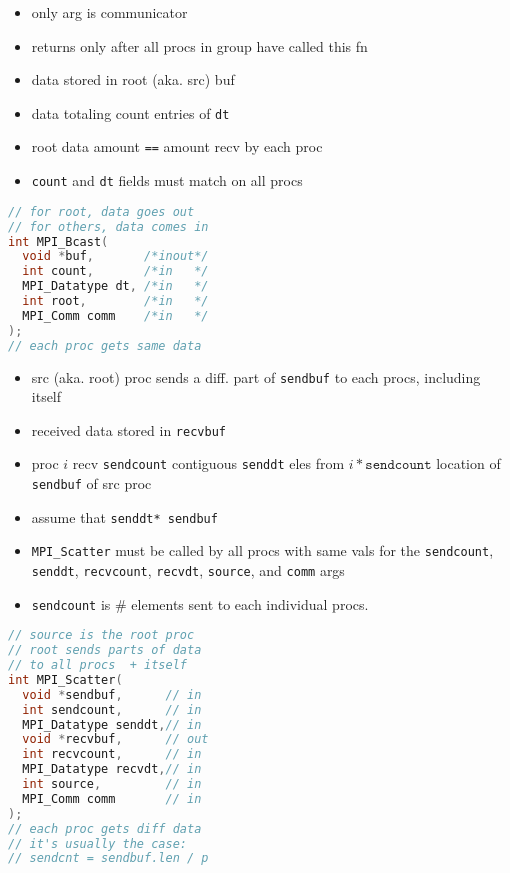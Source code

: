 \begin{minipage}{0.5\linewidth}
  \flushleft
  \begin{itemize}
  \item only arg is communicator
  \item returns only after all procs in group have called this fn
  \item data stored in root (aka. src) buf
  \item data totaling count entries of \texttt{dt}
  \item root data amount \texttt{==} amount recv by each proc
  \item \texttt{count} and \texttt{dt} fields must match on all procs
  \end{itemize}
\end{minipage}
\begin{minipage}{0.5\linewidth}
\begin{lstlisting}[language=c,xleftmargin=1pt]
// for root, data goes out
// for others, data comes in
int MPI_Bcast(
  void *buf,       /*inout*/
  int count,       /*in   */
  MPI_Datatype dt, /*in   */
  int root,        /*in   */
  MPI_Comm comm    /*in   */
);
// each proc gets same data
\end{lstlisting}
\end{minipage}

\begin{minipage}{0.5\linewidth}
  \flushleft
  \begin{itemize}
  \item src (aka. root) proc sends a diff. part of \texttt{sendbuf} to each procs, including itself
  \item received data stored in \texttt{recvbuf}
  \item proc $i$ recv \texttt{sendcount} contiguous \texttt{senddt} eles from $i*\texttt{sendcount}$ location of \texttt{sendbuf} of src proc
  \item assume that \texttt{senddt* sendbuf}
  \item \texttt{MPI\_Scatter} must be called by all procs with same vals for the \texttt{sendcount}, \texttt{senddt}, \texttt{recvcount}, \texttt{recvdt}, \texttt{source}, and \texttt{comm} args
  \item \texttt{sendcount} is $\#$ elements sent to each individual procs.
  \end{itemize}
\end{minipage}
\begin{minipage}{0.5\linewidth}
\begin{lstlisting}[language=c,xleftmargin=1pt]
// source is the root proc
// root sends parts of data
// to all procs  + itself
int MPI_Scatter(
  void *sendbuf,      // in
  int sendcount,      // in
  MPI_Datatype senddt,// in
  void *recvbuf,      // out
  int recvcount,      // in
  MPI_Datatype recvdt,// in
  int source,         // in
  MPI_Comm comm       // in
);
// each proc gets diff data
// it's usually the case:
// sendcnt = sendbuf.len / p
\end{lstlisting}
\end{minipage}

